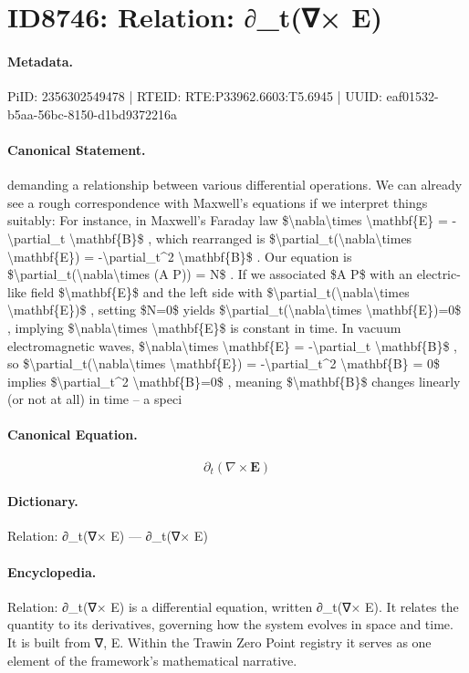 \section*{ID8746: Relation: ∂\_t(∇× E)}
\paragraph{Metadata.}
PiID: 2356302549478 | RTEID: RTE:P33962.6603:T5.6945 | UUID: eaf01532-b5aa-56bc-8150-d1bd9372216a

\paragraph{Canonical Statement.}
demanding a relationship between various differential operations. We can already see a rough correspondence with Maxwell’s equations if we interpret things suitably: For instance, in Maxwell’s Faraday law \$\textbackslash{}nabla\textbackslash{}times \textbackslash{}mathbf\{E\} = -\textbackslash{}partial\_t \textbackslash{}mathbf\{B\}\$ , which rearranged is \$\textbackslash{}partial\_t(\textbackslash{}nabla\textbackslash{}times \textbackslash{}mathbf\{E\}) = -\textbackslash{}partial\_t\textasciicircum{}2 \textbackslash{}mathbf\{B\}\$ . Our equation is \$\textbackslash{}partial\_t(\textbackslash{}nabla\textbackslash{}times (A P)) = N\$ . If we associated \$A P\$ with an electric-like field \$\textbackslash{}mathbf\{E\}\$ and the left side with \$\textbackslash{}partial\_t(\textbackslash{}nabla\textbackslash{}times \textbackslash{}mathbf\{E\})\$ , setting \$N=0\$ yields \$\textbackslash{}partial\_t(\textbackslash{}nabla\textbackslash{}times \textbackslash{}mathbf\{E\})=0\$ , implying \$\textbackslash{}nabla\textbackslash{}times \textbackslash{}mathbf\{E\}\$ is constant in time. In vacuum electromagnetic waves, \$\textbackslash{}nabla\textbackslash{}times \textbackslash{}mathbf\{E\} = -\textbackslash{}partial\_t \textbackslash{}mathbf\{B\}\$ , so \$\textbackslash{}partial\_t(\textbackslash{}nabla\textbackslash{}times \textbackslash{}mathbf\{E\}) = -\textbackslash{}partial\_t\textasciicircum{}2 \textbackslash{}mathbf\{B\} = 0\$ implies \$\textbackslash{}partial\_t\textasciicircum{}2 \textbackslash{}mathbf\{B\}=0\$ , meaning \$\textbackslash{}mathbf\{B\}\$ changes linearly (or not at all) in time – a speci

\paragraph{Canonical Equation.}
\[
\partial_t(\nabla\times \mathbf{E})
\]

\paragraph{Dictionary.}
Relation: ∂\_t(∇× E) — ∂\_t(∇× E)

\paragraph{Encyclopedia.}
Relation: ∂\_t(∇× E) is a differential equation, written ∂\_t(∇× E). It relates the quantity to its derivatives, governing how the system evolves in space and time. It is built from ∇, E. Within the Trawin Zero Point registry it serves as one element of the framework's mathematical narrative.

